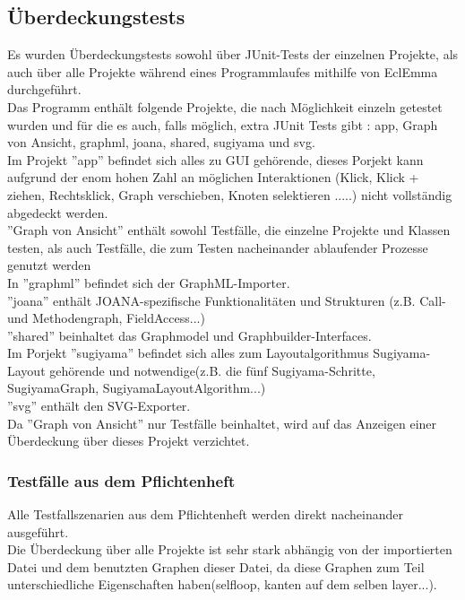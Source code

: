 \subsection{Überdeckungstests}
Es wurden Überdeckungstests sowohl über JUnit-Tests der einzelnen Projekte, als auch über alle Projekte während eines Programmlaufes mithilfe von EclEmma durchgeführt.\\
Das Programm enthält folgende Projekte, die nach Möglichkeit einzeln getestet wurden und für die es auch, falls möglich, extra JUnit Tests gibt : app, Graph von Ansicht, graphml, joana, shared, sugiyama und svg.\\
Im Projekt ''app'' befindet sich alles zu GUI gehörende, dieses Porjekt kann aufgrund der enom hohen Zahl an möglichen Interaktionen (Klick, Klick + ziehen, Rechtsklick, Graph verschieben, Knoten selektieren .....) nicht vollständig abgedeckt werden.\\
''Graph von Ansicht'' enthält sowohl Testfälle, die einzelne Projekte und Klassen testen, als auch Testfälle, die zum Testen nacheinander ablaufender Prozesse genutzt werden\\
In ''graphml'' befindet sich der GraphML-Importer.\\
''joana'' enthält JOANA-spezifische Funktionalitäten und Strukturen (z.B. Call- und Methodengraph, FieldAccess...)\\
''shared'' beinhaltet das Graphmodel und Graphbuilder-Interfaces.\\
Im Porjekt ''sugiyama'' befindet sich alles zum Layoutalgorithmus Sugiyama-Layout gehörende und notwendige(z.B. die fünf Sugiyama-Schritte, SugiyamaGraph, SugiyamaLayoutAlgorithm...)\\
''svg'' enthält den SVG-Exporter.\\
Da ''Graph von Ansicht'' nur Testfälle beinhaltet, wird auf das Anzeigen einer Überdeckung über dieses Projekt verzichtet.\\


\subsubsection{Testfälle aus dem Pflichtenheft}
Alle Testfallszenarien aus dem Pflichtenheft werden direkt nacheinander ausgeführt.\\
Die Überdeckung über alle Projekte ist sehr stark abhängig von der importierten Datei und dem benutzten Graphen dieser Datei, da diese Graphen zum Teil unterschiedliche Eigenschaften haben(selfloop, kanten auf dem selben layer...).\\

